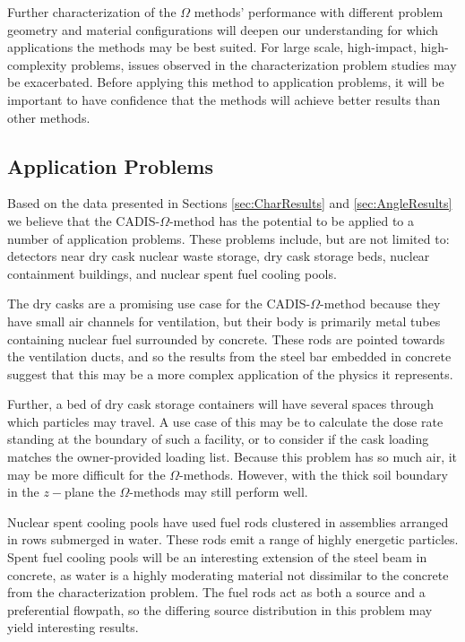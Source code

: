 Further characterization of the $\Omega$ methods' performance with different
problem geometry and material configurations will deepen our understanding for
which applications the methods may be best suited. For large scale, high-impact,
high-complexity problems, issues observed in the characterization problem
studies may be exacerbated. Before applying this method to application problems,
it will be important to have confidence that the methods will achieve better
results than other methods.

\subsection{Application Problems}
\label{subsec:appprobs}

Based on the data presented in Sections \ref{sec:CharResults} and
\ref{sec:AngleResults} we believe that the
CADIS-$\Omega$-method has
the potential to be applied to a number of application problems.
These
problems include, but are not limited to: detectors near dry cask nuclear waste
storage, dry cask storage beds, nuclear containment buildings, and nuclear spent fuel
cooling pools.

The dry casks are a promising use case for the CADIS-$\Omega$-method because
they have small air
channels for ventilation, but their body is primarily metal tubes containing
nuclear fuel surrounded by concrete.
These rods are pointed towards the ventilation ducts, and so the
results from the steel bar embedded in concrete suggest that this may be a more
complex application of the physics it represents.

Further, a bed of dry cask storage containers will have several spaces through
which particles may travel. A use case of this may be to calculate the dose rate
standing at the boundary of such a facility, or to consider if the cask loading
matches the owner-provided loading list. Because this problem has so much
air, it may be more difficult for the $\Omega$-methods. However, with the thick
soil boundary in the $z-$plane the $\Omega$-methods may still perform well.

Nuclear spent cooling pools have used fuel rods clustered in assemblies arranged
in rows submerged in water. These rods emit a range of
highly energetic particles. Spent fuel cooling
pools will be an interesting extension of the steel beam in concrete, as water
is a highly moderating material not dissimilar to the concrete from the
characterization problem. The fuel rods act as both a source and a preferential
flowpath, so the differing source distribution in this
problem may yield interesting results.

